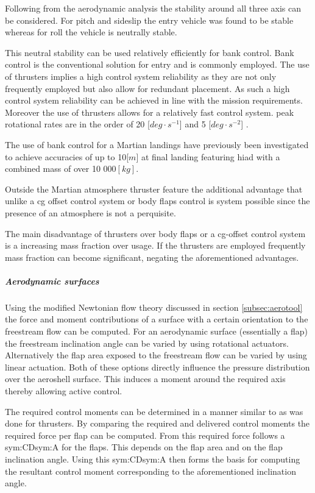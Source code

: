 Following from the aerodynamic analysis the stability around all three axis can be considered. For pitch and sideslip the entry vehicle was found to be stable whereas for roll the vehicle is neutrally stable. 

This neutral stability can be used relatively efficiently for bank control. Bank control is the conventional solution for entry and is commonly employed. The use of thrusters implies a high control system reliability as they are not only frequently employed but also allow for redundant placement. As such a high control system reliability can be achieved in line with the mission requirements. Moreover the use of thrusters allows for a relatively fast control system. peak rotational rates are in the order of 20 [$deg\cdot s^{-1}$] and 5 [$deg \cdot s^{-2}$] \cite{Davis2010}.

The use of bank control for a Martian landings have previously been investigated \cite{Davis2010} to achieve accuracies of up to 10[$m$] at final landing featuring \gls{hiad} with a combined mass of over 10 000$\left[kg\right]$.

Outside the Martian atmosphere thruster feature the additional advantage that unlike a \gls{cg} offset control system or body flaps control is system possible since the presence of an atmosphere is not a perquisite.

The main disadvantage of thrusters over body flaps or a \gls{cg}-offset control system is a increasing mass fraction over usage. If the thrusters are employed frequently mass fraction can become significant, negating the aforementioned advantages.


\subparagraph{Aerodynamic surfaces}

Using the modified Newtonian flow theory discussed in section \ref{subsec:aerotool} the force and moment contributions of a surface with a certain orientation to the freestream flow can be computed. For an aerodynamic surface (essentially a flap) the freestream inclination angle can be varied by using rotational actuators. Alternatively the flap area exposed to the freestream flow can be varied by using linear actuation. Both of these options directly influence the pressure distribution over the aeroshell surface. This induces a moment around the required axis thereby allowing active control.

The required control moments can be determined in a manner similar to as was done for thrusters. By comparing the required and delivered control moments the required force per flap can be computed. From this required force follows a \gls{sym:CD}\gls{sym:A} for the flaps. This depends on the flap area and on the flap inclination angle. Using this \gls{sym:CD}\gls{sym:A} then forms the basis for computing the resultant control moment corresponding to the aforementioned inclination angle.

